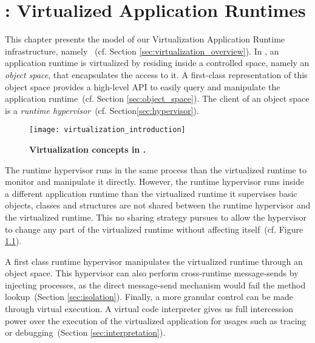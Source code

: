

\chapter{\VTT: Virtualized Application Runtimes}
\minitoc
\introduction

This chapter presents the model of our Virtualization Application Runtime infrastructure, namely \VTT~(cf. Section \ref{sec:virtualization_overview}). In \VTT, an application runtime is virtualized by residing inside a controlled space, namely an \emph{object space}, that encapsulates the access to it. A first-class representation of this object space provides a high-level API to easily query and manipulate the application runtime~(cf. Section \ref{sec:object_space}). The client of an object space is a \emph{runtime hypervisor}~(cf. Section\ref{sec:hypervisor}).

\begin{figure}[htb]
\begin{center}
\texttt{[image: virtualization\_introduction]}
\caption{\textbf{Virtualization concepts in \Vtt.}\label{fig:virtualization_introduction}}
\end{center}
\end{figure}

The runtime hypervisor runs in the same process than the virtualized runtime to monitor and manipulate it directly. However, the runtime hypervisor runs inside a different application runtime than the virtualized runtime it supervises \ie basic objects, classes and \VM structures are not shared between the runtime hypervisor and the virtualized runtime. This no sharing strategy pursues to allow the hypervisor to change any part of the virtualized runtime without affecting itself~(cf. Figure \ref{fig:virtualization_introduction}).

A first class runtime hypervisor manipulates the virtualized runtime through an object space. This hypervisor can also perform cross-runtime message-sends by injecting processes, as the direct message-send \VM mechanism would fail the method lookup~(Section \ref{sec:isolation}).
Finally, a more granular control can be made through virtual execution. A virtual code interpreter gives us full intercession power over the execution of the virtualized application for usages such as tracing or debugging~(Section \ref{sec:interpretation}).

